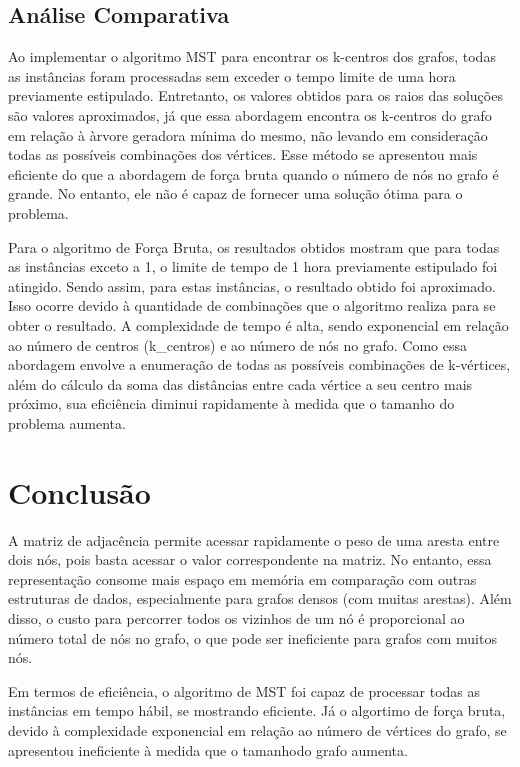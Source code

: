 \subsection{\esp Análise Comparativa}
Ao implementar o algoritmo MST para encontrar os k-centros dos grafos, todas as instâncias foram processadas sem exceder o tempo limite de uma hora previamente estipulado. Entretanto, os valores obtidos para os raios das soluções são valores aproximados, já que essa abordagem encontra os k-centros do grafo em relação à àrvore geradora mínima do mesmo, não levando em consideração todas as possíveis combinações dos vértices. Esse método se apresentou mais eficiente do que a abordagem de força bruta quando o número de nós no grafo é grande. No entanto, ele não é capaz de fornecer uma solução ótima para o problema.

Para o algoritmo de Força Bruta, os resultados obtidos mostram que para todas as instâncias exceto a 1, o limite de tempo de 1 hora previamente estipulado foi atingido. Sendo assim, para estas instâncias, o resultado obtido foi aproximado. Isso ocorre devido à quantidade de combinações que o algoritmo realiza para se obter o resultado.  A complexidade de tempo é alta, sendo exponencial em relação ao número de centros (k\_centros) e ao número de nós no grafo. Como essa abordagem envolve a enumeração de todas as possíveis combinações de k-vértices, além do cálculo da soma das distâncias entre cada vértice a seu centro mais próximo, sua eficiência diminui rapidamente à medida que o tamanho do problema aumenta.


\section{\esp Conclusão}
A matriz de adjacência permite acessar rapidamente o peso de uma aresta entre dois nós, pois basta acessar o valor correspondente na matriz. No entanto, essa representação consome mais espaço em memória em comparação com outras estruturas de dados, especialmente para grafos densos (com muitas arestas). Além disso, o custo para percorrer todos os vizinhos de um nó é proporcional ao número total de nós no grafo, o que pode ser ineficiente para grafos com muitos nós.

Em termos de eficiência, o algoritmo de MST foi capaz de processar todas as instâncias em tempo hábil, se mostrando eficiente. Já o algortimo de força bruta, devido à complexidade exponencial em relação ao número de vértices do grafo, se apresentou ineficiente à medida que o tamanhodo grafo aumenta.  

